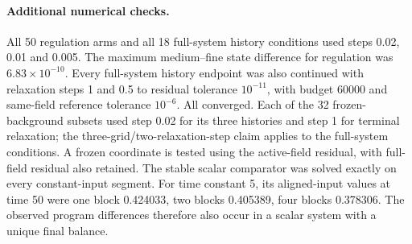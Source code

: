 \paragraph{Additional numerical checks.} All 50 regulation arms and all 18 full-system history conditions used steps 0.02, 0.01 and 0.005. The maximum medium--fine state difference for regulation was $6.83\times10^{-10}$. Every full-system history endpoint was also continued with relaxation steps 1 and 0.5 to residual tolerance $10^{-11}$, with budget 60000 and same-field reference tolerance $10^{-6}$. All converged. Each of the 32 frozen-background subsets used step 0.02 for its three histories and step 1 for terminal relaxation; the three-grid/two-relaxation-step claim applies to the full-system conditions. A frozen coordinate is tested using the active-field residual, with full-field residual also retained. The stable scalar comparator was solved exactly on every constant-input segment. For time constant 5, its aligned-input values at time 50 were one block 0.424033, two blocks 0.405389, four blocks 0.378306. The observed program differences therefore also occur in a scalar system with a unique final balance.
